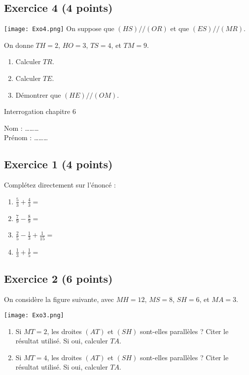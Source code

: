 \documentclass[14 pt]{extarticle}
\theoremstyle{plain}
\begin{document}
 
 \subsection*{Exercice 4 (4 points)}
 
 \texttt{[image: Exo4.png]}\newline
 On suppose que $(HS)//(OR)$ et que $(ES)//(MR)$. 
 
 On donne $TH = 2$, $HO = 3$, $TS= 4$, et $TM= 9$. 
 
 \begin{enumerate}
 \item Calculer $TR$. 
 \item Calculer $TE$.  
 \item Démontrer que $(HE)//(OM)$. 
 \end{enumerate}
 
 \newpage
 
 
 \begin{center}{\Large Interrogation chapitre 6}\\ 
 \end{center}
 Nom : \ldots\ldots\ldots\\
 Prénom : \ldots\ldots\ldots
 
 \subsection*{Exercice 1 (4 points)}
 Complétez directement sur l'énoncé : 
 
 \begin{enumerate}
 \item $\frac53 + \frac43 =  $ 
 \item $\frac79 - \frac89= $ 
 \item $\frac25 - \frac13 +  \frac1{15} =  $
 \item $\frac13 + \frac15 =  $
 \end{enumerate}
 
\subsection*{Exercice 2 (6 points)} 
 
On considère la figure suivante, avec $MH = 12$, $MS= 8$, $SH = 6$, et $MA = 3$. 

 \texttt{[image: Exo3.png]}\newline
\begin{enumerate}
\item Si $MT= 2$, les droites $(AT)$ et $(SH)$ sont-elles parallèles ? Citer le résultat utilisé. Si oui, calculer $TA$. 
\item Si $MT= 4$, les droites $(AT)$ et $(SH)$ sont-elles parallèles ?  Citer le résultat utilisé. Si oui, calculer $TA$. 
\end{enumerate}
 
\end{document}
